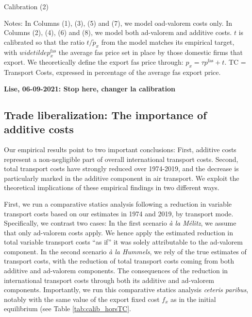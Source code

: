 \documentclass[a4paper,11pt]{article}
\begin{document}
\begin{table}[htbp]
  \centering
  \caption{Calibration (2)}\label{tab:calib_TC}
\begin{center}
	
\end{center}
{\parbox[l]{12cm}{ \vspace{4pt}\footnotesize{Notes: In Columns (1), (3), (5) and (7), we model oad-valorem costs only. In Columns (2), (4), (6) and (8), we model both ad-valorem and additive costs. $t$ is calibrated so that the ratio $t/\widetilde{p}_x$ from the model matches its empirical target, with $widetilde{p}^{\text{fas}}_x$ the average fas price set in place by those domestic firms that export. We theoretically define the export fas price through: $p_x = \tau p^{\text{fas}} +t$. TC = Transport Costs, expressed in percentage of the average fas export price.}}}
\end{table}

\textbf{Lise, 06-09-2021: Stop here, changer la calibration}

\subsection{Trade liberalization: The importance of additive costs}

Our empirical results point to two important conclusions: First, additive costs represent a non-negligible part of overall international transport costs. Second, total transport costs have strongly reduced over 1974-2019, and the decrease is particularly marked in the additive component in air transport. We exploit the theoretical implications of these empirical findings in two different ways.

First, we run a comparative statics analysis following a reduction in variable transport costs based on our estimates in 1974 and 2019, by transport mode. Specifically, we contrast two cases: In the first scenario \textit{à la Mélitz}, we assume that only ad-valorem costs apply. We hence apply the estimated reduction in total variable transport costs ``as if'' it was solely attributable to the ad-valorem component. In the second scenario \textit{à la Hummels}, we rely of the true estimates of transport costs, with the reduction of total transport costs coming from both additive and ad-valorem components. The consequences of the reduction in international transport costs through both its additive and ad-valorem components. Importantly, we run this comparative statics analysis \textit{ceteris paribus}, notably with the same value of the export fixed cost $f_x$ as in the initial equilibrium (see Table \ref{tab:calib_horsTC}.
\end{document}

